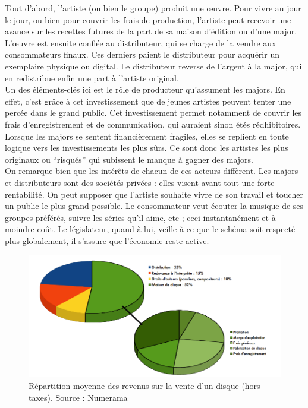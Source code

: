 \documentclass[a4paper]{report}
\begin{document}
	Tout d'abord, l'artiste (ou bien le groupe) produit une œuvre. Pour vivre au jour le jour, ou bien pour couvrir les frais de production, l'artiste peut recevoir une avance sur les recettes futures de la part de sa maison d'édition ou d'une major. L'œuvre est ensuite confiée au distributeur, qui se charge de la vendre aux consommateurs finaux. Ces derniers paient le distributeur pour acquérir un exemplaire physique ou digital. Le distributeur reverse de l'argent à la major, qui en redistribue enfin une part à l'artiste original.\\

	Un des éléments-clés ici est le rôle de producteur qu'assument les majors. En effet, c'est grâce à cet investissement que de jeunes artistes peuvent tenter une percée dans le grand public. Cet investissement permet notamment de couvrir les frais d'enregistrement et de communication, qui auraient sinon étés rédhibitoires. Lorsque les majors se sentent financièrement fragiles, elles se replient en toute logique vers les investissements les plus sûrs. Ce sont donc les artistes les plus originaux ou ``risqués'' qui subissent le manque à gagner des majors.\\

	On remarque bien que les intérêts de chacun de ces acteurs diffèrent. Les majors et distributeurs sont des sociétés privées : elles visent avant tout une forte rentabilité. On peut supposer que l'artiste souhaite vivre de son travail et toucher un public le plus grand possible. Le consommateur veut écouter la musique de ses groupes préférés, suivre les séries qu'il aime, etc ; ceci instantanément et à moindre coût. Le législateur, quand à lui, veille à ce que le schéma soit respecté – plus globalement, il s'assure que l'économie reste active.

	\begin{figure}[ht]
		\includegraphics[width=13cm]{images/repartition-des-revenus.png}
		\caption{Répartition moyenne des revenus sur la vente d'un disque (hors taxes). Source : Numerama}
	\end{figure}
\end{document}
